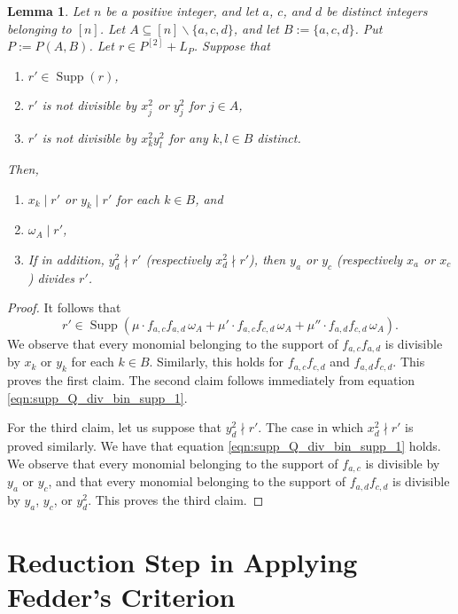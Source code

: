 \documentclass[12pt,a4paper]{amsart}
\theoremstyle{plain}
\newtheorem{lem}[thrm]{Lemma}
\def\blem{\begin{lem}}
\def\elem{\end{lem}}
\theoremstyle{definition}
\def\bproof{\begin{proof}}
\def\eproof{\end{proof}}
\theoremstyle{remark}
\let\setminus=\smallsetminus
\DeclareMathOperator{\Supp}{Supp}
\renewcommand{\subset}{\subseteq}
\begin{document}
\blem
\label{lem:supp_Q_div_bin_supp}
Let $n$ be a positive integer, and let $a$, $c$, and $d$ be distinct integers belonging to $[n]$. Let $A \subset [n] \setminus \{a,c,d\}$, and let $B := \{a,c,d\}$. Put $P := P(A,B)$. Let $r \in P^{[2]} + L_{P}$.  Suppose that 
\begin{enumerate}
    \item $r' \in \Supp(r)$,
    \item $r'$ is not divisible by $x_{j}^{2}$ or $y_{j}^{2}$ for $j \in A$,
    \item $r'$ is not divisible by $x_{k}^{2}y_{l}^{2}$ for any $k,l \in B$ distinct.
\end{enumerate}
Then,
\begin{enumerate}
    \item $x_{k} \mid r'$ or $y_{k} \mid r'$ for each $k \in B$, and
    \item $\omega_{A} \mid r'$, 
    \item If in addition, $y_{d}^{2} \nmid r'$ (respectively $x_{d}^{2} \nmid r'$), then $y_{a}$ or $y_{c}$ (respectively $x_{a}$ or $x_{c}$) divides $r'$.
\end{enumerate}
\elem 

\bproof
It follows that 
\begin{equation}
    \label{eqn:supp_Q_div_bin_supp_1}
    r' \in \Supp(\mu \cdot f_{a,c}f_{a,d} \,\omega_{A} + \mu' \cdot f_{a,c}f_{c,d} \, \omega_{A} + \mu'' \cdot f_{a,d}f_{c,d} \, \omega_{A}).
\end{equation}
We observe that every monomial belonging to the support of $f_{a,c}f_{a,d}$ is divisible by $x_{k}$ or $y_{k}$ for each $k \in B$. Similarly, this holds for $f_{a,c}f_{c,d}$ and $f_{a,d}f_{c,d}$. This proves the first claim. The second claim follows immediately from equation \eqref{eqn:supp_Q_div_bin_supp_1}.

For the third claim, let us suppose that $y_{d}^{2} \nmid r'$. The case in which $x_{d}^{2} \nmid r'$ is proved similarly. We have that equation \eqref{eqn:supp_Q_div_bin_supp_1} holds. We observe that every monomial belonging to the support of $f_{a,c}$ is divisible by $y_{a}$ or $y_{c}$, and that every monomial belonging to the support of $f_{a,d}f_{c,d}$ is divisible by $y_{a}$, $y_{c}$, or $y_{d}^{2}$. This proves the third claim.
\eproof

\section{Reduction Step in Applying Fedder's Criterion}
\label{sec:reduction_step_fedder_criterion}
\end{document}

